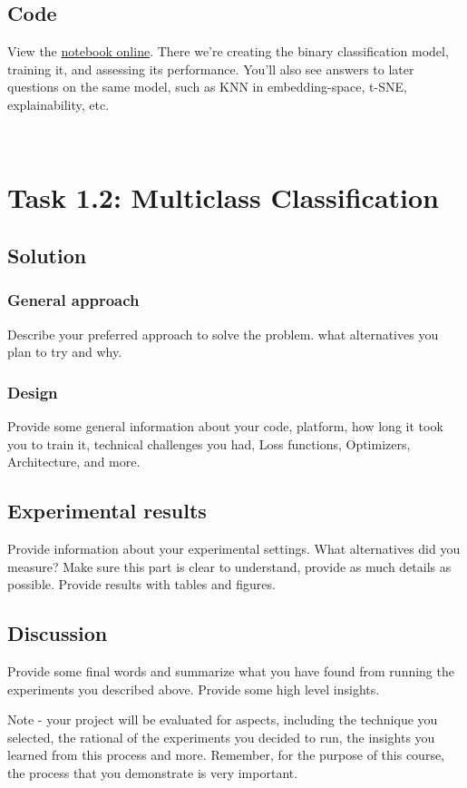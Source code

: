 \documentclass{article}
\begin{document}
\subsection{Code}

View the \href{https://www.kaggle.com/code/nitsanbh/lungs-x-ray}{notebook online}. There we're creating the binary classification model, training it, and assessing its performance. You'll also see answers to later questions on the same model, such as KNN in embedding-space, t-SNE, explainability, etc.

\
\section{Task 1.2: Multiclass Classification}

\subsection{Solution}
\subsubsection{General approach}
Describe your preferred approach to solve the problem. what alternatives you plan to try and why. 

\subsubsection{Design}
Provide some general information about your code, platform, how long it took you to train it, technical challenges you had, Loss functions, Optimizers, Architecture, and more.

\subsection{Experimental results}
Provide information about your experimental settings. What alternatives did you measure? Make sure this part is clear to understand, provide as much details as possible. Provide results with tables and figures.

\subsection{Discussion}
Provide some final words and summarize what you have found from running the experiments you described above. Provide some high level insights.

Note - your project will be evaluated for aspects, including the technique you selected, the rational of the experiments you decided to run, the insights you learned from this process and more. Remember, for the purpose of this course, the process that you demonstrate is very  important.
\end{document}
